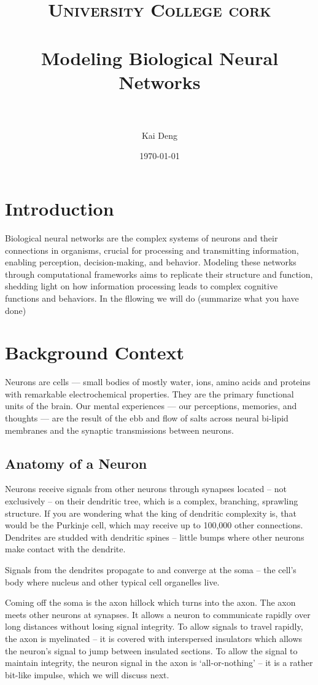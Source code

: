 \documentclass[paper=a4, fontsize=11pt]{scrartcl} %
\title{	
\normalfont \normalsize 
\textsc{University College cork} \\ [25pt] %
\horrule{0.5pt} \\[0.4cm] %
\huge Modeling Biological Neural Networks \\ %
\horrule{2pt} \\[0.5cm] %
}
\author{Kai Deng} %
\date{\normalsize\today} %
\numberwithin{equation}{section} %
\numberwithin{figure}{section} %
\numberwithin{table}{section} %
\begin{document}
\maketitle %

\tableofcontents
\clearpage

\section{Introduction}
Biological neural networks are the complex systems of neurons and their connections in organisms, crucial for processing and transmitting information, enabling perception, decision-making, and behavior. Modeling these networks through computational frameworks aims to replicate their structure and function, shedding light on how information processing leads to complex cognitive functions and behaviors. 
In the fllowing we will do (summarize what you have done)


\section{Background Context}
Neurons are cells — small bodies of mostly water, ions, amino acids and proteins with remarkable electrochemical properties. They are the primary functional units of the brain. Our mental experiences — our perceptions, memories, and thoughts — are the result of the ebb and flow of salts across neural bi-lipid membranes and the synaptic transmissions between neurons. 

\subsection{Anatomy of a Neuron}
Neurons receive signals from other neurons through synapses located – not exclusively – on their dendritic tree, which is a complex, branching, sprawling structure. If you are wondering what the king of dendritic complexity is, that would be the Purkinje cell, which may receive up to 100,000 other connections. Dendrites are studded with dendritic spines – little bumps where other neurons make contact with the dendrite.

\vspace{10pt}
Signals from the dendrites propagate to and converge at the soma – the cell’s body where nucleus and other typical cell organelles live.

\vspace{10pt}
Coming off the soma is the axon hillock which turns into the axon. The axon meets other neurons at synapses. It allows a neuron to communicate rapidly over long distances without losing signal integrity. To allow signals to travel rapidly, the axon is myelinated – it is covered with interspersed insulators which allows the neuron’s signal to jump between insulated sections. To allow the signal to maintain integrity, the neuron signal in the axon is ‘all-or-nothing’ – it is a rather bit-like impulse, which we will discuss next.
\end{document}
